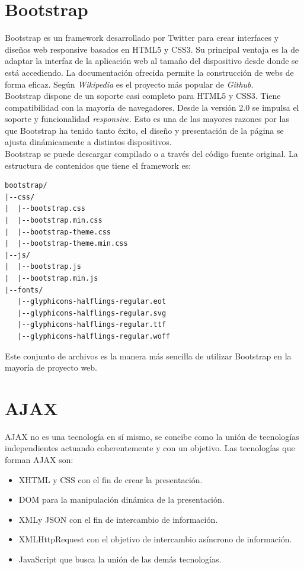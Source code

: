 \documentclass[a4paper, 12pt]{book}
\begin{document}
\section{Bootstrap}
\label{sec:seccion6}
Bootstrap es un framework desarrollado por Twitter para crear interfaces y diseños web responsive
basados en HTML5 y CSS3. Su principal ventaja es la de adaptar la interfaz de la aplicación web
al tamaño del dispositivo desde donde se está accediendo. La documentación ofrecida permite la
construcción de webs de forma eficaz. Según \emph{Wikipedia} es el proyecto más popular de
\emph{Github}. \\

Bootstrap dispone de un soporte casi completo para HTML5 y CSS3. Tiene compatibilidad con la mayoría
de navegadores. Desde la versión 2.0 se impulsa el soporte y funcionalidad \emph{responsive}. Esto
es una de las mayores razones por las que Bootstrap ha tenido tanto éxito, el diseño y presentación
de la página se ajusta dinámicamente a distintos dispositivos. \\

Bootstrap se puede descargar compilado o a través del código fuente original. La estructura de 
contenidos que tiene el framework es:

\begingroup
\fontsize{9pt}{10pt}\selectfont
\begin{verbatim}
bootstrap/
|--css/
|  |--bootstrap.css
|  |--bootstrap.min.css
|  |--bootstrap-theme.css
|  |--bootstrap-theme.min.css
|--js/
|  |--bootstrap.js
|  |--bootstrap.min.js
|--fonts/
   |--glyphicons-halflings-regular.eot
   |--glyphicons-halflings-regular.svg
   |--glyphicons-halflings-regular.ttf
   |--glyphicons-halflings-regular.woff
\end{verbatim}
\endgroup

Este conjunto de archivos es la manera más sencilla de utilizar Bootstrap en la mayoría 
de proyecto web.


\section{AJAX}
\label{sec:seccion7}

AJAX no es una tecnología en sí mismo, se concibe como la unión de tecnologías independientes
actuando coherentemente y con un objetivo. Las tecnologías que forman AJAX son:

\begin{itemize}
  \item XHTML y CSS con el fin de crear la presentación.
	\item DOM para la manipulación dinámica de la presentación.
	\item XMLy JSON con el fin de intercambio de información.
	\item XMLHttpRequest con el objetivo de intercambio asíncrono de información.
	\item JavaScript que busca la unión de las demás tecnologías.
\end{itemize}
\end{document}
